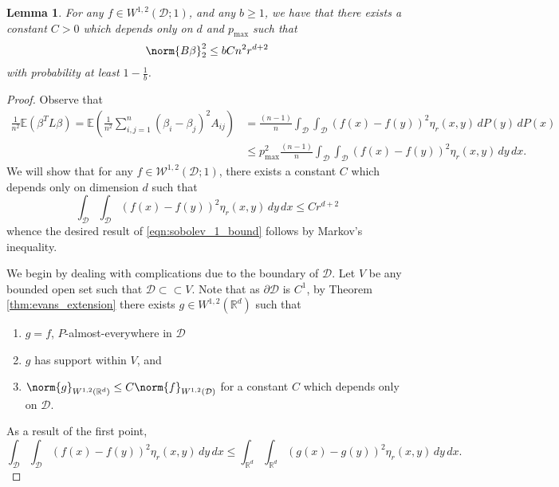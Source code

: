 \documentclass{article}
\newcommand{\Reals}{\mathbb{R}}
\newcommand{\1}{\mathbb{I}}
\newcommand{\D}{\mathcal{D}}
\newcommand{\Rd}{\Reals^d}
\newcommand{\Ebb}{\mathbb{E}}
\theoremstyle{alden}
\theoremstyle{aldenthm}
\newtheorem{lemma}{Lemma}
\theoremstyle{definition}
\theoremstyle{remark}
\begin{document}
\begin{lemma}
	\label{lem:sobolev_1_bound}
	For any $f \in W^{1,2}(\mathcal{D};1)$, and any $b \geq 1$, we have that there exists a constant $C > 0$ which depends only on $d$ and $p_{\max}$ such that
	\begin{equation}
	\label{eqn:sobolev_1_bound}
	\norm{B\beta}_2^2 \leq b C n^2 r^{d + 2}
	\end{equation}
	with probability at least $1 - \frac{1}{b}$. 
\end{lemma}
\begin{proof}
	Observe that
	\begin{align*}
	\frac{1}{n^2}\Ebb(\beta^T L \beta) = \Ebb\left(\frac{1}{n^2} \sum_{i,j = 1}^{n} (\beta_i - \beta_j)^2 A_{ij}\right) & = \frac{(n - 1)}{n} \int_{\D} \int_{\D} (f(x) - f(y))^2\eta_r(x,y) \,dP(y) \,dP(x) \\
	& \leq p_{\max}^2 \frac{(n - 1)}{n} \int_{\D} \int_{\D} (f(x) - f(y))^2\eta_r(x,y) \,dy \,dx.
	\end{align*}
	We will show that for any $f \in \mathcal{W}^{1,2}(\D;1)$, there exists a constant $C$ which depends only on dimension $d$ such that
	\begin{equation}
	\label{eqn:mean_bound}
	\int_{\D} \int_{\D} (f(x) - f(y))^2\eta_r(x,y) \,dy \,dx \leq C r^{d + 2}
	\end{equation}
	whence the desired result of \eqref{eqn:sobolev_1_bound} follows by Markov's inequality.
	
	We begin by dealing with complications due to the boundary of $\mathcal{D}$. Let $V$ be any bounded open set such that $\D \subset \subset V$. Note that as $\partial \D$ is $C^1$, by Theorem \ref{thm:evans_extension} there exists $g \in W^{1,2}(\Reals^d)$ such that
	\begin{enumerate}
		\item
		\label{eqn:evans_extension_1}
		$g = f$, $P$-almost-everywhere in $\D$
		\item 
		$g$ has support within $V$, and  
		\item 
		\label{eqn:sobolev_1_bound_2}
		$\norm{g}_{W^{1,2}(\Rd)} \leq C \norm{f}_{W^{1,2}(\D)}$ for a constant $C$ which depends only on $\mathcal{D}$.
	\end{enumerate}
	As a result of the first point,
	\begin{equation}
	\label{eqn:sobolev_1_bound_1}
	\int_{\D} \int_{\D} (f(x) - f(y))^2\eta_r(x,y) \,dy \,dx \leq \int_{\Rd} \int_{\Rd} (g(x) - g(y))^2\eta_r(x,y) \,dy \,dx.
	\end{equation}
	

\end{proof}
\end{document}
